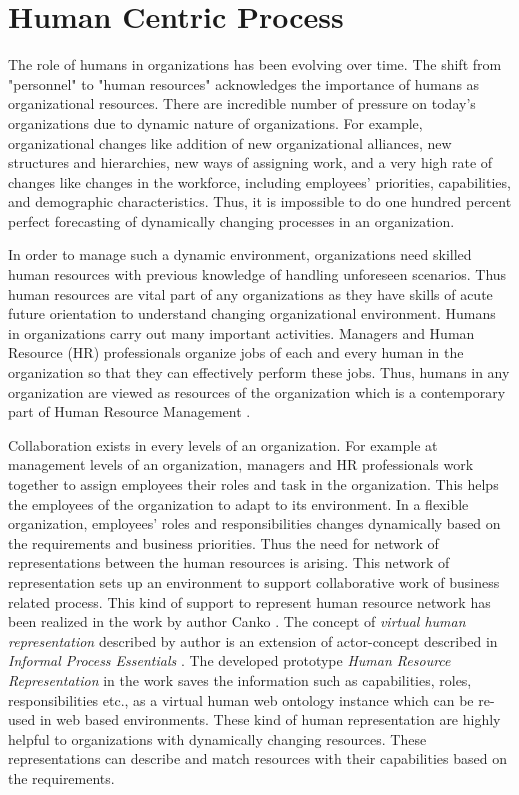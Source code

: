 \section{Human Centric Process}
\label{sec:humancentric}
The role of humans in organizations has been evolving over time. The shift from "personnel" to "human resources" acknowledges the importance of humans as organizational resources. There are incredible number of pressure on today's organizations \cite{May2016} due to dynamic nature of organizations. For example, organizational changes like addition of new organizational alliances, new structures and hierarchies, new ways of assigning work, and a very high rate of changes like changes in the workforce, including employees' priorities, capabilities, and demographic characteristics. Thus, it is impossible to do one hundred percent perfect forecasting of dynamically changing processes in an organization.

In order to manage such a dynamic environment, organizations need skilled human resources with previous knowledge of handling unforeseen scenarios. Thus human resources are vital part of any organizations as they have skills of acute future orientation to understand changing organizational environment. Humans in organizations carry out many important activities. Managers and Human Resource (HR) professionals organize jobs of each and every human in the organization so that they can effectively perform these jobs. Thus, humans in any organization are viewed as resources of the organization which is a contemporary part of Human Resource Management \cite{Bianca2016}.

 Collaboration exists in every levels of an organization. For example at management levels of an organization, managers and HR professionals work together to assign employees their roles and task in the organization. This helps the employees of the organization to adapt to its environment. In a flexible organization, employees' roles and responsibilities changes dynamically based on the requirements and business priorities. Thus the need for network of representations between the human resources is arising. This network of representation sets up an environment to support collaborative work of business related process. This kind of support to represent human resource network has been realized in the work by author Canko \cite{Canko2015}. The concept of \textit{virtual human representation} described by author is an extension of actor-concept described in \textit{Informal Process Essentials} \cite{Sungur2014a}. The developed prototype \textit{Human Resource Representation} in the work \cite{Canko2015} saves the information such as capabilities, roles, responsibilities etc., as a virtual human web ontology instance which can be re-used in web based environments. These kind of human representation are highly helpful to organizations with dynamically changing resources. These representations can describe and match resources with their capabilities based on the requirements.

